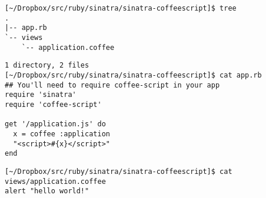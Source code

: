 
\begin{verbatim}
[~/Dropbox/src/ruby/sinatra/sinatra-coffeescript]$ tree
.
|-- app.rb
`-- views
    `-- application.coffee
\end{verbatim}

\begin{verbatim}
1 directory, 2 files
[~/Dropbox/src/ruby/sinatra/sinatra-coffeescript]$ cat app.rb 
## You'll need to require coffee-script in your app
require 'sinatra'
require 'coffee-script'

get '/application.js' do
  x = coffee :application
  "<script>#{x}</script>"
end
\end{verbatim}

\begin{verbatim}
[~/Dropbox/src/ruby/sinatra/sinatra-coffeescript]$ cat views/application.coffee 
alert "hello world!"
\end{verbatim}


